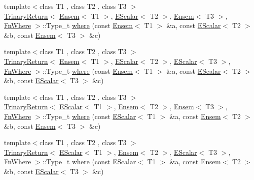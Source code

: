 \begin{DoxyCompactItemize}
\item 
{\footnotesize template$<$class T1 , class T2 , class T3 $>$ }\\\mbox{\hyperlink{structENSEM_1_1TrinaryReturn}{Trinary\+Return}}$<$ \mbox{\hyperlink{classENSEM_1_1Ensem}{Ensem}}$<$ T1 $>$, \mbox{\hyperlink{classENSEM_1_1EScalar}{E\+Scalar}}$<$ T2 $>$, \mbox{\hyperlink{classENSEM_1_1Ensem}{Ensem}}$<$ T3 $>$, \mbox{\hyperlink{structENSEM_1_1FnWhere}{Fn\+Where}} $>$\+::Type\+\_\+t \mbox{\hyperlink{group__eensem_ga8e810f6bd36674024a877b4ff879c3fe}{where}} (const \mbox{\hyperlink{classENSEM_1_1Ensem}{Ensem}}$<$ T1 $>$ \&a, const \mbox{\hyperlink{classENSEM_1_1EScalar}{E\+Scalar}}$<$ T2 $>$ \&b, const \mbox{\hyperlink{classENSEM_1_1Ensem}{Ensem}}$<$ T3 $>$ \&c)
\item 
{\footnotesize template$<$class T1 , class T2 , class T3 $>$ }\\\mbox{\hyperlink{structENSEM_1_1TrinaryReturn}{Trinary\+Return}}$<$ \mbox{\hyperlink{classENSEM_1_1Ensem}{Ensem}}$<$ T1 $>$, \mbox{\hyperlink{classENSEM_1_1EScalar}{E\+Scalar}}$<$ T2 $>$, \mbox{\hyperlink{classENSEM_1_1EScalar}{E\+Scalar}}$<$ T3 $>$, \mbox{\hyperlink{structENSEM_1_1FnWhere}{Fn\+Where}} $>$\+::Type\+\_\+t \mbox{\hyperlink{group__eensem_ga16076c28e8993bb0aad6e627a1f0b018}{where}} (const \mbox{\hyperlink{classENSEM_1_1Ensem}{Ensem}}$<$ T1 $>$ \&a, const \mbox{\hyperlink{classENSEM_1_1EScalar}{E\+Scalar}}$<$ T2 $>$ \&b, const \mbox{\hyperlink{classENSEM_1_1EScalar}{E\+Scalar}}$<$ T3 $>$ \&c)
\item 
{\footnotesize template$<$class T1 , class T2 , class T3 $>$ }\\\mbox{\hyperlink{structENSEM_1_1TrinaryReturn}{Trinary\+Return}}$<$ \mbox{\hyperlink{classENSEM_1_1EScalar}{E\+Scalar}}$<$ T1 $>$, \mbox{\hyperlink{classENSEM_1_1Ensem}{Ensem}}$<$ T2 $>$, \mbox{\hyperlink{classENSEM_1_1Ensem}{Ensem}}$<$ T3 $>$, \mbox{\hyperlink{structENSEM_1_1FnWhere}{Fn\+Where}} $>$\+::Type\+\_\+t \mbox{\hyperlink{group__eensem_ga25b89d44a0521a8e9be1de7b1e8010b8}{where}} (const \mbox{\hyperlink{classENSEM_1_1EScalar}{E\+Scalar}}$<$ T1 $>$ \&a, const \mbox{\hyperlink{classENSEM_1_1Ensem}{Ensem}}$<$ T2 $>$ \&b, const \mbox{\hyperlink{classENSEM_1_1Ensem}{Ensem}}$<$ T3 $>$ \&c)
\item 
{\footnotesize template$<$class T1 , class T2 , class T3 $>$ }\\\mbox{\hyperlink{structENSEM_1_1TrinaryReturn}{Trinary\+Return}}$<$ \mbox{\hyperlink{classENSEM_1_1EScalar}{E\+Scalar}}$<$ T1 $>$, \mbox{\hyperlink{classENSEM_1_1Ensem}{Ensem}}$<$ T2 $>$, \mbox{\hyperlink{classENSEM_1_1EScalar}{E\+Scalar}}$<$ T3 $>$, \mbox{\hyperlink{structENSEM_1_1FnWhere}{Fn\+Where}} $>$\+::Type\+\_\+t \mbox{\hyperlink{group__eensem_gaa4e0f13f6f2d07520289a95c6290a38b}{where}} (const \mbox{\hyperlink{classENSEM_1_1EScalar}{E\+Scalar}}$<$ T1 $>$ \&a, const \mbox{\hyperlink{classENSEM_1_1Ensem}{Ensem}}$<$ T2 $>$ \&b, const \mbox{\hyperlink{classENSEM_1_1EScalar}{E\+Scalar}}$<$ T3 $>$ \&c)

\end{DoxyCompactItemize}
